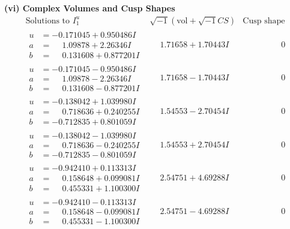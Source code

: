 \documentclass[1p]{elsarticle_modified}
\theoremstyle{definition}
\newcommand{\I}{\sqrt{-1}}
\begin{document}
\newpage\flushleft \textbf{(vi) Complex Volumes and Cusp Shapes}
$$\begin{array}{c|c|c}  
\text{Solutions to }I^u_{1}& \I (\text{vol} + \sqrt{-1}CS) & \text{Cusp shape}\\
 \hline 
\begin{aligned}
u &= -0.171045 + 0.950486 I \\
a &= \phantom{-}1.09878 + 2.26346 I \\
b &= \phantom{-}0.131608 + 0.877201 I\end{aligned}
 & \phantom{-}1.71658 + 1.70443 I & \phantom{-0.000000 } 0 \\ \hline\begin{aligned}
u &= -0.171045 - 0.950486 I \\
a &= \phantom{-}1.09878 - 2.26346 I \\
b &= \phantom{-}0.131608 - 0.877201 I\end{aligned}
 & \phantom{-}1.71658 - 1.70443 I & \phantom{-0.000000 } 0 \\ \hline\begin{aligned}
u &= -0.138042 + 1.039980 I \\
a &= \phantom{-}0.718636 + 0.240255 I \\
b &= -0.712835 + 0.801059 I\end{aligned}
 & \phantom{-}1.54553 - 2.70454 I & \phantom{-0.000000 } 0 \\ \hline\begin{aligned}
u &= -0.138042 - 1.039980 I \\
a &= \phantom{-}0.718636 - 0.240255 I \\
b &= -0.712835 - 0.801059 I\end{aligned}
 & \phantom{-}1.54553 + 2.70454 I & \phantom{-0.000000 } 0 \\ \hline\begin{aligned}
u &= -0.942410 + 0.113313 I \\
a &= \phantom{-}0.158648 + 0.099081 I \\
b &= \phantom{-}0.455331 + 1.100300 I\end{aligned}
 & \phantom{-}2.54751 + 4.69288 I & \phantom{-0.000000 } 0 \\ \hline\begin{aligned}
u &= -0.942410 - 0.113313 I \\
a &= \phantom{-}0.158648 - 0.099081 I \\
b &= \phantom{-}0.455331 - 1.100300 I\end{aligned}
 & \phantom{-}2.54751 - 4.69288 I & \phantom{-0.000000 } 0 \\ \hline\begin{aligned}

\end{aligned}
\end{array}$$
\end{document}
